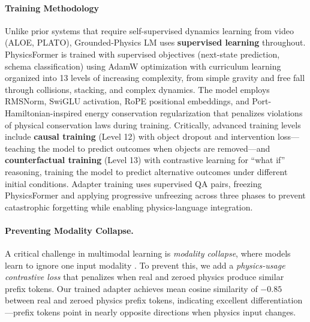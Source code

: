 \documentclass[conference]{IEEEtran}
\theoremstyle{plain}
\theoremstyle{definition}
\theoremstyle{remark}
\begin{document}
\paragraph{Training Methodology} Unlike prior systems that require self-supervised dynamics learning from video (ALOE, PLATO), Grounded-Physics LM uses \textbf{supervised learning} throughout. PhysicsFormer is trained with supervised objectives (next-state prediction, schema classification) using AdamW optimization with curriculum learning organized into 13 levels of increasing complexity, from simple gravity and free fall through collisions, stacking, and complex dynamics. The model employs RMSNorm, SwiGLU activation, RoPE positional embeddings, and Port-Hamiltonian-inspired energy conservation regularization \cite{desai2024phmarl,greydanus2019hamiltonian} that penalizes violations of physical conservation laws during training. Critically, advanced training levels include \textbf{causal training} (Level 12) with object dropout and intervention loss---teaching the model to predict outcomes when objects are removed---and \textbf{counterfactual training} (Level 13) with contrastive learning for ``what if'' reasoning, training the model to predict alternative outcomes under different initial conditions. Adapter training uses supervised QA pairs, freezing PhysicsFormer and applying progressive unfreezing across three phases to prevent catastrophic forgetting while enabling physics-language integration.

\paragraph{Preventing Modality Collapse.} A critical challenge in multimodal learning is \emph{modality collapse}, where models learn to ignore one input modality \cite{goyal2017making,agrawal2018dont}. To prevent this, we add a \emph{physics-usage contrastive loss} that penalizes when real and zeroed physics produce similar prefix tokens. Our trained adapter achieves mean cosine similarity of $-0.85$ between real and zeroed physics prefix tokens, indicating excellent differentiation---prefix tokens point in nearly opposite directions when physics input changes.
\end{document}

